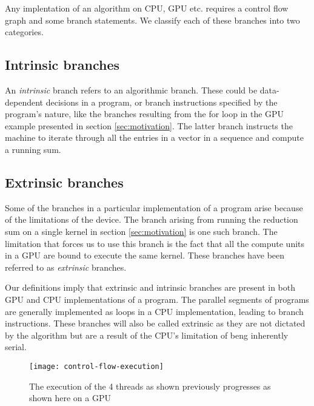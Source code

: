 \label{sec:problem-description}
Any implentation of an algorithm on CPU, GPU etc. requires a control flow graph and some branch statements. We classify each of these branches into two categories.
\subsection{Intrinsic branches}
	An \textit{intrinsic} branch refers to an algorithmic branch. These could be data-dependent decisions in a program, or branch instructions specified by the program's nature, like the branches resulting from the for loop in the GPU example presented in section \ref{sec:motivation}. The latter branch instructs the machine to iterate through all the entries in a vector in a sequence and compute a running sum.

\subsection{Extrinsic branches}
	Some of the branches in a particular implementation of a program arise because of the limitations of the device. The branch arising from running the reduction sum on a single kernel in section \ref{sec:motivation} is one such branch. The limitation that forces us to use this branch is the fact that all the compute units in a GPU are bound to execute the same kernel. These branches have been referred to as \textit{extrinsic} branches.

\par{
	Our definitions imply that extrinsic and intrinsic branches are present in both GPU and CPU implementations of a program. The parallel segments of programs are generally implemented as loops in a CPU implementation, leading to branch instructions. These branches will also be called extrinsic as they are not dictated by the algorithm but are a result of the CPU's limitation of beng inherently serial.
}

\begin{figure}
	\centering
	\texttt{[image: control-flow-execution]}
	\caption{The execution of the 4 threads as shown previously progresses as shown here on a GPU
		\label{fig:control-flow-execution}}
\end{figure}

